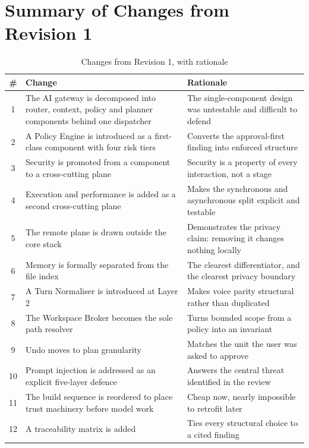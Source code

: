 \documentclass[11pt]{article}
\begin{document}
\section{Summary of Changes from Revision 1}
\label{sec:changes}

\begin{table}[htbp]
\centering
\small
\caption{Changes from Revision 1, with rationale}
\label{tab:changes}
\begin{tabular}{@{}cp{}p{}@{}}
\toprule
\textbf{\#} & \textbf{Change} & \textbf{Rationale} \\
\midrule
1 & The AI gateway is decomposed into router, context, policy and planner components behind one dispatcher & The single-component design was untestable and difficult to defend \\
2 & A Policy Engine is introduced as a first-class component with four risk tiers & Converts the approval-first finding into enforced structure \\
3 & Security is promoted from a component to a cross-cutting plane & Security is a property of every interaction, not a stage \\
4 & Execution and performance is added as a second cross-cutting plane & Makes the synchronous and asynchronous split explicit and testable \\
5 & The remote plane is drawn outside the core stack & Demonstrates the privacy claim: removing it changes nothing locally \\
6 & Memory is formally separated from the file index & The clearest differentiator, and the clearest privacy boundary \\
7 & A Turn Normaliser is introduced at Layer 2 & Makes voice parity structural rather than duplicated \\
8 & The Workspace Broker becomes the sole path resolver & Turns bounded scope from a policy into an invariant \\
9 & Undo moves to plan granularity & Matches the unit the user was asked to approve \\
10 & Prompt injection is addressed as an explicit five-layer defence & Answers the central threat identified in the review \\
11 & The build sequence is reordered to place trust machinery before model work & Cheap now, nearly impossible to retrofit later \\
12 & A traceability matrix is added & Ties every structural choice to a cited finding \\
\bottomrule
\end{tabular}
\end{table}
\end{document}
